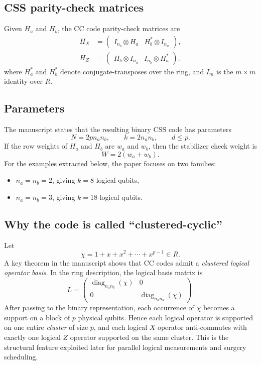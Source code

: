 \documentclass[11pt]{article}
\begin{document}
\subsection{CSS parity-check matrices}
Given $H_a$ and $H_b$, the CC code parity-check matrices are
\begin{align}
H_X &= \left(\begin{array}{c|c} I_{n_b} \otimes H_a & H_b^{*} \otimes I_{n_a} \end{array}\right), \\
H_Z &= \left(\begin{array}{c|c} H_b \otimes I_{n_a} & I_{n_b} \otimes H_a^{*} \end{array}\right),
\end{align}
where $H_a^{*}$ and $H_b^{*}$ denote conjugate-transposes over the ring, and $I_m$ is the $m\times m$ identity over $R$.

\subsection{Parameters}
The manuscript states that the resulting binary CSS code has parameters
\[
N = 2pn_an_b,
\qquad
k = 2n_an_b,
\qquad
d \le p.
\]
If the row weights of $H_a$ and $H_b$ are $w_a$ and $w_b$, then the stabilizer check weight is
\[
W = 2(w_a+w_b).
\]
For the examples extracted below, the paper focuses on two families:
\begin{itemize}
    \item $n_a=n_b=2$, giving $k=8$ logical qubits,
    \item $n_a=n_b=3$, giving $k=18$ logical qubits.
\end{itemize}

\subsection{Why the code is called ``clustered-cyclic''}
Let
\[
\chi = 1+x+x^2+\cdots+x^{p-1} \in R.
\]
A key theorem in the manuscript shows that CC codes admit a \emph{clustered logical operator basis}. In the ring description, the logical basis matrix is
\[
L=
\left(
\begin{array}{c|c}
\operatorname{diag}_{n_an_b}(\chi) & 0 \\
\hline
0 & \operatorname{diag}_{n_an_b}(\chi)
\end{array}
\right).
\]
After passing to the binary representation, each occurrence of $\chi$ becomes a support on a block of $p$ physical qubits. Hence each logical operator is supported on one entire \emph{cluster} of size $p$, and each logical $X$ operator anti-commutes with exactly one logical $Z$ operator supported on the same cluster. This is the structural feature exploited later for parallel logical measurements and surgery scheduling.
\end{document}
